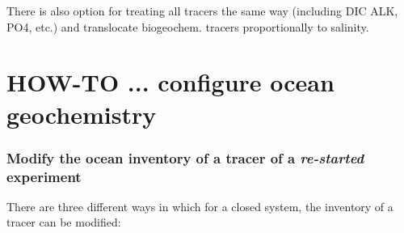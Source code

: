 \documentclass[11pt,fleqn]{book} %
\begin{document}
There is also option for treating all tracers the same way (including DIC ALK, PO4, etc.) and translocate biogeochem. tracers proportionally to salinity.


\newpage


\section{HOW-TO ...  configure ocean geochemistry}

%
\subsubsection{Modify the ocean inventory of a tracer of a \textit{re-started} experiment}
\vspace{1mm}

There are three different ways in which for a closed system, the inventory of a tracer can be modified:
\end{document}
